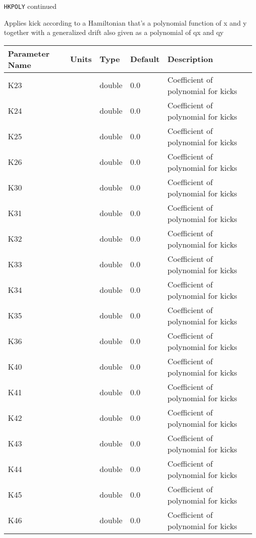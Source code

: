\newpage
\begin{center}{\Large\verb|HKPOLY| continued}\end{center}
Applies kick according to a Hamiltonian that's a polynomial function of x and y together with a generalized drift also given as a polynomial of qx and qy
\\
\begin{tabular}{|l|l|l|l|p{\descwidth}|} \hline
Parameter Name & Units & Type & Default & Description \\ \hline 
K23 &  & double &  0.0 & Coefficient of polynomial for kicks  \\ \hline 
K24 &  & double &  0.0 & Coefficient of polynomial for kicks  \\ \hline 
K25 &  & double &  0.0 & Coefficient of polynomial for kicks  \\ \hline 
K26 &  & double &  0.0 & Coefficient of polynomial for kicks  \\ \hline 
K30 &  & double &  0.0 & Coefficient of polynomial for kicks  \\ \hline 
K31 &  & double &  0.0 & Coefficient of polynomial for kicks  \\ \hline 
K32 &  & double &  0.0 & Coefficient of polynomial for kicks  \\ \hline 
K33 &  & double &  0.0 & Coefficient of polynomial for kicks  \\ \hline 
K34 &  & double &  0.0 & Coefficient of polynomial for kicks  \\ \hline 
K35 &  & double &  0.0 & Coefficient of polynomial for kicks  \\ \hline 
K36 &  & double &  0.0 & Coefficient of polynomial for kicks  \\ \hline 
K40 &  & double &  0.0 & Coefficient of polynomial for kicks  \\ \hline 
K41 &  & double &  0.0 & Coefficient of polynomial for kicks  \\ \hline 
K42 &  & double &  0.0 & Coefficient of polynomial for kicks  \\ \hline 
K43 &  & double &  0.0 & Coefficient of polynomial for kicks  \\ \hline 
K44 &  & double &  0.0 & Coefficient of polynomial for kicks  \\ \hline 
K45 &  & double &  0.0 & Coefficient of polynomial for kicks  \\ \hline 
K46 &  & double &  0.0 & Coefficient of polynomial for kicks  \\ \hline 
\end{tabular}

